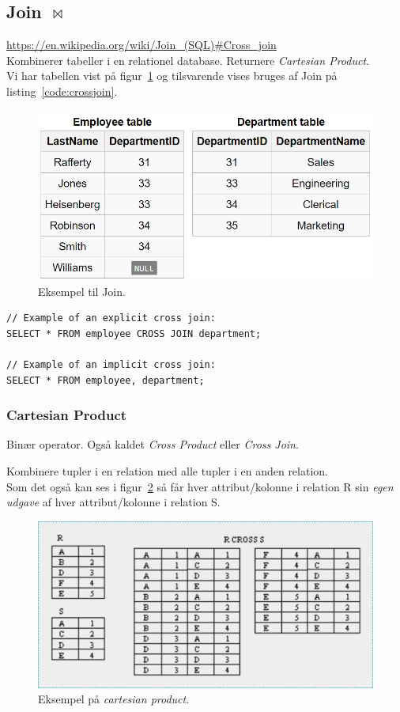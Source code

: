 \subsection{Join $\Join$}

\url{https://en.wikipedia.org/wiki/Join_(SQL)#Cross_join}\\

Kombinerer tabeller i en relationel database. Returnere \textit{Cartesian Product}.\\
Vi har tabellen vist på figur~\ref{fig:employee_dept} og tilsvarende vises bruges af Join på listing~\ref{code:crossjoin}.

\begin{figure}[H]
\centering
\includegraphics[width=0.6\linewidth]{figs/spm6/employee_dept}
\caption{Eksempel til Join.}
\label{fig:employee_dept}
\end{figure}

\begin{lstlisting}[caption=SQL for Cross Join,label=code:crossjoin,morekeywords={SELECT, FROM, WHERE, CROSS, JOIN}]
// Example of an explicit cross join:
SELECT * FROM employee CROSS JOIN department;

// Example of an implicit cross join:
SELECT * FROM employee, department;
\end{lstlisting}

\subsubsection{Cartesian Product}
Binær operator. Også kaldet \textit{Cross Product} eller \textit{Cross Join}. 

Kombinere tupler i en relation med alle tupler i en anden relation.\\

Som det også kan ses i figur~\ref{fig:cartesian_product} så får hver attribut/kolonne i relation R sin \textit{egen udgave} af hver attribut/kolonne i relation S.

\begin{figure}[H]
	\centering
	\includegraphics[width=0.6\linewidth]{figs/spm6/cartesianproduct}
	\caption{Eksempel på \textit{cartesian product}.}
	\label{fig:cartesian_product}
\end{figure}

